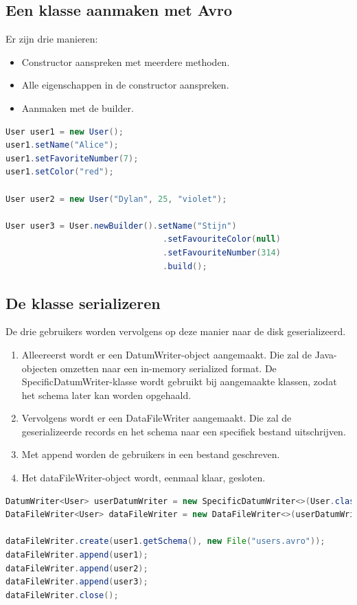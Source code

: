 \documentclass[a4paper,10pt,twoside]{report}
\begin{document}
\subsection{Een klasse aanmaken met Avro}

Er zijn drie manieren:

\begin{itemize}
	\item Constructor aanspreken met meerdere methoden.
	\item Alle eigenschappen in de constructor aanspreken.
	\item Aanmaken met de builder.
\end{itemize}

\begin{lstlisting}[language=Java]
User user1 = new User();
user1.setName("Alice");
user1.setFavoriteNumber(7);
user1.setColor("red");

User user2 = new User("Dylan", 25, "violet");

User user3 = User.newBuilder().setName("Stijn")
								.setFavouriteColor(null)
								.setFavouriteNumber(314)
								.build();
\end{lstlisting}

\subsection{De klasse serializeren}

De drie gebruikers worden vervolgens op deze manier naar de disk geserializeerd.

\begin{enumerate}
	\item Alleereerst wordt er een DatumWriter-object aangemaakt. Die zal de Java-objecten omzetten naar een in-memory serialized format. De SpecificDatumWriter-klasse wordt gebruikt bij aangemaakte klassen, zodat het schema later kan worden opgehaald.
	\item Vervolgens wordt er een DataFileWriter aangemaakt. Die zal de geserializeerde records en het schema naar een specifiek bestand uitschrijven.
	\item Met append worden de gebruikers in een bestand geschreven.
	\item Het dataFileWriter-object wordt, eenmaal klaar, gesloten.
\end{enumerate}

\begin{lstlisting}[language=Java]
DatumWriter<User> userDatumWriter = new SpecificDatumWriter<>(User.class);
DataFileWriter<User> dataFileWriter = new DataFileWriter<>(userDatumWriter);

dataFileWriter.create(user1.getSchema(), new File("users.avro"));
dataFileWriter.append(user1);
dataFileWriter.append(user2);
dataFileWriter.append(user3);
dataFileWriter.close();
\end{lstlisting}
\end{document}
